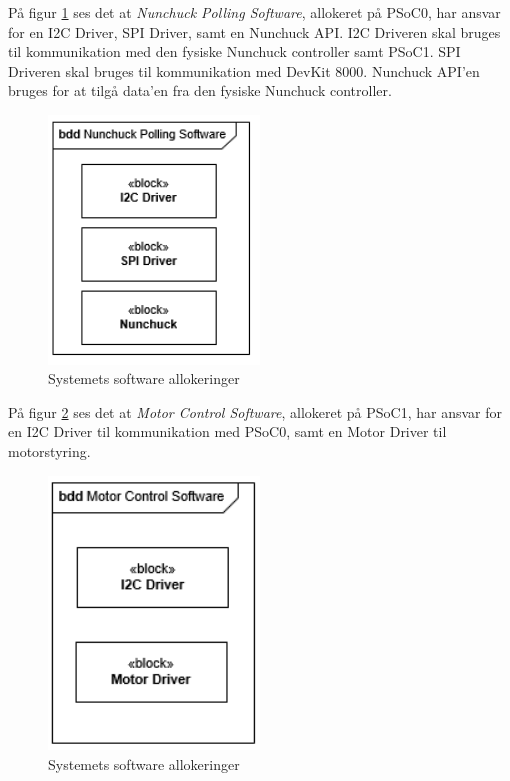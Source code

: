 På figur \ref{fig:NunchuckPollingAllocationClasses} ses det at \textit{Nunchuck Polling Software}, allokeret på PSoC0, har ansvar for en I2C Driver, SPI Driver, samt en Nunchuck API. I2C Driveren skal bruges til kommunikation med den fysiske Nunchuck controller samt PSoC1. SPI Driveren skal bruges til kommunikation med DevKit 8000. Nunchuck API'en bruges for at tilgå data'en fra den fysiske Nunchuck controller.

\begin{figure}[H]
	\centering
	\includegraphics[width=0.5\textwidth]{SystemArkitektur/images/NunchukPollingAllocationClasses.PNG}
	\caption{Systemets software allokeringer}
	\label{fig:NunchuckPollingAllocationClasses}
\end{figure}

På figur \ref{fig:MotorControlAllocationClasses} ses det at \textit{Motor Control Software}, allokeret på PSoC1, har ansvar for en I2C Driver til kommunikation med PSoC0, samt en Motor Driver til motorstyring.

\begin{figure}[H]
	\centering
	\includegraphics[width=0.5\textwidth]{SystemArkitektur/images/MotorControlAllocationClasses.PNG}
	\caption{Systemets software allokeringer}
	\label{fig:MotorControlAllocationClasses}
\end{figure}

